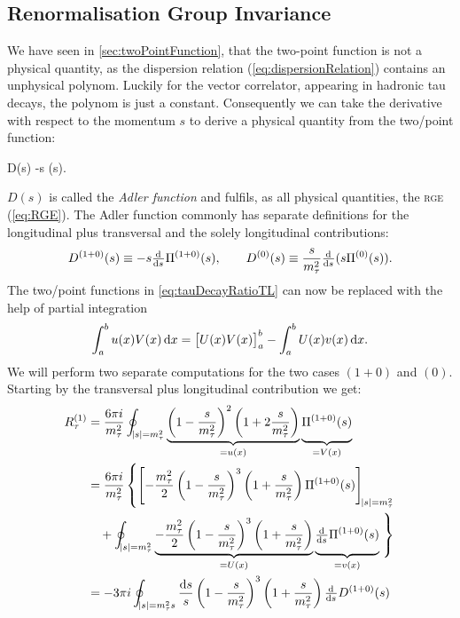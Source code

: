 \documentclass[../../index.tex]{subfiles}
\begin{document}
\subsection{Renormalisation Group Invariance}
We have seen in \cref{sec:twoPointFunction}, that the two-point function is not
a physical quantity, as the dispersion relation (\cref{eq:dispersionRelation})
contains an unphysical polynom. Luckily for the vector correlator, appearing in
hadronic tau decays, the polynom is just a constant. Consequently we can take
the derivative with respect to the momentum \(s\) to derive a physical quantity
from the two\-/point function:
\begin{tcolorbox}
  D(s) \equiv -s  \Pi(s).
\end{tcolorbox}
\(D(s)\) is called the \textit{Adler function} and fulfils, as all physical
quantities, the \textsc{rge} (\cref{eq:RGE}). The Adler function commonly has
separate definitions for the longitudinal plus transversal and the solely
longitudinal contributions:
\begin{equation}
  \label{eq:adlerFunction}
  D^{(1+0)}(s) \equiv -s \od{}{s} \Pi^{(1+0)}(s), \qquad D^{(0)}(s) \equiv \frac{s}{m_\tau^2} \od{}{s} (s \Pi^{(0)}(s)).
\end{equation}
The two\-/point functions in \cref{eq:tauDecayRatioTL} can now be replaced with
the help of partial integration
\begin{equation}
  \int_a^b u(x) V(x) \dif x = \left[ U(x) V(x) \right]_a^b - \int_a^b U(x) v(x) \dif x.
\end{equation}
We will perform two separate computations for the two cases \((1+0)\) and
\((0)\). Starting by the transversal plus longitudinal contribution we get:
\begin{equation}
  \begin{split}
    R_\tau^{(1)} &= \frac{6 \pi i}{m_\tau^2}
    \oint_{\abs{s}=m_\tau^2}\underbrace{ \left( 1 - \frac{s}{m_\tau^2} \right)^2
      \left( 1 + 2 \frac{s}{m_\tau^2} \right)
    }_{= u(x)} \underbrace{ \vphantom{\left( \frac{s}{m_\tau^2} \right)} \Pi^{(1+0)}(s)}_{=V(x)} \\
    &= \frac{6 \pi i}{m_\tau^2} \left\{ \left[ -\frac{m_\tau^2}{2} \left( 1 -
          \frac{s}{m_\tau^2} \right)^3 \left( 1 + \frac{s}{m_\tau^2} \right)
        \Pi^{(1+0)}(s) \right]_{\abs{s}=m_\tau^2} \right. \\
    &\quad+ \oint_{\abs{s}=m_\tau^2} \underbrace{-\frac{m_\tau^2}{2} \left( 1 -
        \frac{s}{m_\tau^2} \right)^3 \left( 1 + \frac{s}{m_\tau^2} \right)
    }_{=U(x)} \underbrace{\vphantom{\left( \frac{1}{m_\tau^2} \right)}\od{}{s}
      \Pi^{(1+0)}(s)}_{=v(x)}
    \left. \vphantom{\left[ \left( \frac{1}{m_\tau^2} \right) \right]} \right\} \\
    &= -3 \pi i \oint_{\abs{s}=m_\tau^2s} \frac{\dif s}{s} \left( 1 -
      \frac{s}{m_\tau^2} \right)^3 \left( 1 + \frac{s}{m_\tau^2} \right)
    \od{}{s} D^{(1+0)}(s)
  \end{split}
\end{equation}
\end{document}
